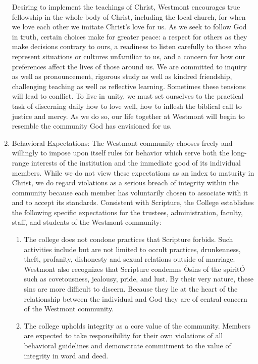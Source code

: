 \documentclass[letterpaper, 11pt]{article}
\begin{document}
\begin{enumerate}[label=\alph*)]
{						Desiring to implement the teachings of Christ, Westmont encourages true fellowship in the whole body of Christ, including the local church, for when we love each other we imitate Christ's love for us.  As we seek to follow God in truth, certain choices make for greater peace:  a respect for others as they make decisions contrary to ours, a readiness to listen carefully to those who represent situations or cultures unfamiliar to us, and a concern for how our preferences affect the lives of those around us.
						We are committed to inquiry as well as pronouncement, rigorous study as well as kindred friendship, challenging teaching as well as reflective learning.   Sometimes these tensions will lead to conflict.  To live in unity, we must set ourselves to the practical task of discerning daily how to love well, how to inflesh the biblical call to justice and mercy.  As we do so, our life together at Westmont will begin to resemble the community God has envisioned for us.
					}
					\item{Behavioral Expectations:
						The Westmont community chooses freely and willingly to impose upon itself rules for behavior which serve both the long-range interests of the institution and the immediate good of its individual members.  While we do not view these expectations as an index to maturity in Christ, we do regard violations as a serious breach of integrity within the community because each member has voluntarily chosen to associate with it and to accept its standards.
						Consistent with Scripture, the College establishes the following specific expectations for the trustees, administration, faculty, staff, and students of the Westmont community:
						\begin{enumerate}[label=\arabic*)]
							\item{The college does not condone practices that Scripture forbids.  Such activities include but are not limited to occult practices, drunkenness, theft, profanity, dishonesty and sexual relations outside of marriage.  Westmont also recognizes that Scripture condemns Òsins of the spiritÓ such as covetousness, jealousy, pride, and lust.  By their very nature, these sins are more difficult to discern.  Because they lie at the heart of the relationship between the individual and God they are of central concern of the Westmont community.}
							\item{The college upholds integrity as a core value of the community.  Members are expected to take responsibility for their own violations of all behavioral guidelines and demonstrate commitment to the value of integrity in word and deed.}

\end{enumerate}}
\end{enumerate}
\end{document}
